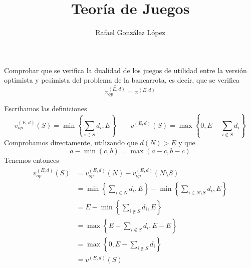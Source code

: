 \documentclass[twoside]{article}
\begin{document}
\title{Teoría de Juegos}
\author{Rafael González López}
\maketitle

\begin{ejercicio}{1} Comprobar que se verifica la dualidad de los juegos de utilidad entre la versión optimista y pesimista del problema de la bancarrota, es decir, que se verifica
$$
\overline{v_{op}^{(E,d)}} = v^{(E,d)}
$$ 
\end{ejercicio}
\begin{solucion}
Escribamos las definiciones
$$
v_{op}^{(E,d)}(S) = \min\left\{\sum_{i\in S} d_i,E\right\}
\qquad
v^{(E,d)}(S) =\max\left\{0,E-\sum_{i\notin S} d_i\right\}
$$
Comprobamos directamente, utilizando que $d(N)>E$ y que $$a-\min(c,b) = \max(a-c,b-c)$$
Tenemos entonces
\begin{align*}
\overline{v_{op}^{(E,d)}}(S) &= v_{op}^{(E,d)}(N)-v_{op}^{(E,d)}(N\setminus S)\\
&= \min\left\{\sum_{i\in N} d_i,E\right\} -  \min\left\{\sum_{i\in N\setminus S} d_i,E\right\}\\
&= E -  \min\left\{\sum_{i\notin S} d_i,E\right\}\\
&= \max\left\{E-\sum_{i\notin S} d_i, E-E\right\}\\
&= \max\left\{0,E-\sum_{i\notin S} d_i\right\}\\
&= v^{(E,d)}(S)
\end{align*}

\end{solucion}
\newpage 
\end{document}
